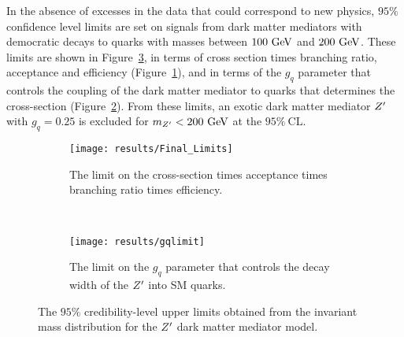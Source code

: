 In the absence of excesses in the data that could correspond to new physics, $95\%$ confidence level limits are set on signals from dark matter mediators with democratic decays to quarks with masses between $100~\mathrm{GeV}$ and $200~\mathrm{GeV}$.
These limits are shown in Figure~\ref{fig:Zprime_limits}, in terms of cross section times branching ratio, acceptance and efficiency (Figure~\ref{fig:cross_section_limits}), and in terms of the $g_{q}$ parameter that controls the coupling of the \gls{dark matter mediator} to quarks that determines the cross-section (Figure~\ref{fig:gq_limits}).
From these limits, an exotic dark matter mediator $Z'$ with $g_{q}=0.25$ is excluded for $m_{Z'} < 200~\mathrm{GeV}$ at the $95\%~\mathrm{CL}$.

\begin{figure}[htbp]
 \centering
 \begin{subfigure}[t]{0.5\textwidth}
  \centering
  \texttt{[image: results/Final\_Limits]}
  \caption{The limit on the cross-section times acceptance times branching ratio times efficiency.}
  \label{fig:cross_section_limits}
 \end{subfigure}%
 ~
 \begin{subfigure}[t]{0.5\textwidth}
  \centering
  \texttt{[image: results/gqlimit]}
  \caption{The limit on the $g_{q}$ parameter that controls the decay width of the $Z'$ into SM quarks.}
  \label{fig:gq_limits}
 \end{subfigure}
 \caption{The $95\%$ credibility-level upper limits obtained from the invariant mass distribution for the $Z'$ dark matter mediator model.}
 \label{fig:Zprime_limits}
\end{figure}
